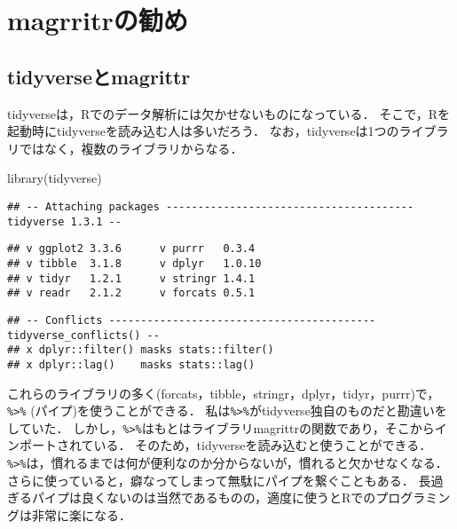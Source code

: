 \documentclass[
]{article}
\newenvironment{Shaded}{\begin{snugshade}}{\end{snugshade}}
\newcommand{\FunctionTok}[1]{\textcolor[rgb]{0.00,0.00,0.00}{#1}}
\newcommand{\NormalTok}[1]{#1}
\begin{document}
\hypertarget{magrittr}{%
\section{magrritrの勧め}\label{magrittr}}

\hypertarget{tidyverseux3068magrittr}{%
\subsection{tidyverseとmagrittr}\label{tidyverseux3068magrittr}}

tidyverseは，Rでのデータ解析には欠かせないものになっている．
そこで，Rを起動時にtidyverseを読み込む人は多いだろう．
なお，tidyverseは1つのライブラリではなく，複数のライブラリからなる．

\begin{Shaded}
\begin{Highlighting}[]
\FunctionTok{library}\NormalTok{(tidyverse)}
\end{Highlighting}
\end{Shaded}

\begin{verbatim}
## -- Attaching packages --------------------------------------- tidyverse 1.3.1 --
\end{verbatim}

\begin{verbatim}
## v ggplot2 3.3.6      v purrr   0.3.4 
## v tibble  3.1.8      v dplyr   1.0.10
## v tidyr   1.2.1      v stringr 1.4.1 
## v readr   2.1.2      v forcats 0.5.1
\end{verbatim}

\begin{verbatim}
## -- Conflicts ------------------------------------------ tidyverse_conflicts() --
## x dplyr::filter() masks stats::filter()
## x dplyr::lag()    masks stats::lag()
\end{verbatim}

これらのライブラリの多く(forcats，tibble，stringr，dplyr，tidyr，purrr)で，\texttt{\%\textgreater{}\%} (パイプ)を使うことができる．
私は\texttt{\%\textgreater{}\%}がtidyverse独自のものだと勘違いをしていた．
しかし，\texttt{\%\textgreater{}\%}はもとはライブラリmagrittrの関数であり，そこからインポートされている．
そのため，tidyverseを読み込むと使うことができる．
\texttt{\%\textgreater{}\%}は，慣れるまでは何が便利なのか分からないが，慣れると欠かせなくなる．
さらに使っていると，癖なってしまって無駄にパイプを繋ぐこともある．
長過ぎるパイプは良くないのは当然であるものの，適度に使うとRでのプログラミングは非常に楽になる．
\end{document}
